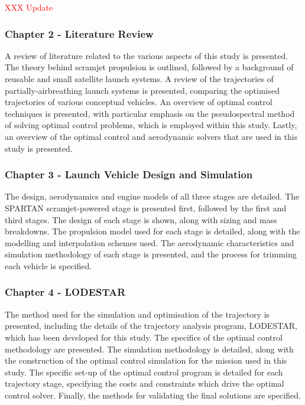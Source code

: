     \textcolor{red}{XXX Update}

    \subsubsection*{Chapter 2 - Literature Review}

      A review of literature related to the various aspects of this study is presented. The theory behind scramjet propulsion is outlined, followed by a background of reusable and small satellite launch systems. A review of the trajectories of partially-airbreathing launch systems is presented, comparing the optimised trajectories of various conceptual vehicles. An overview of optimal control techniques is presented, with particular emphasis on the pseudospectral method of solving optimal control problems, which is employed within this study. Lastly, an overview of the optimal control and aerodynamic solvers that are used in this study is presented.
      

    \subsubsection*{Chapter 3 - Launch Vehicle Design and Simulation}

      The design, aerodynamics and engine models of all three stages are detailed. The SPARTAN scramjet-powered stage is presented first, followed by the first and third stages. The design of each stage is shown, along with sizing and mass breakdowns. The propulsion model used for each stage is detailed, along with the modelling and interpolation schemes used. The aerodynamic characteristics and simulation methodology of each stage is presented, and the process for trimming each vehicle is specified. 
      
      
      \subsubsection*{Chapter 4 - LODESTAR}
      
      The method used for the simulation and optimisation of the trajectory is presented, including the details of the trajectory analysis program, LODESTAR, which has been developed for this study. The specifics of the optimal control methodology are presented. The simulation methodology is detailed, along with the construction of the optimal control simulation for the mission used in this study. The specific set-up of the optimal control program is detailed for each trajectory stage, specifying the costs and constraints which drive the optimal control solver. Finally, the methods for validating the final solutions are specified.
      
